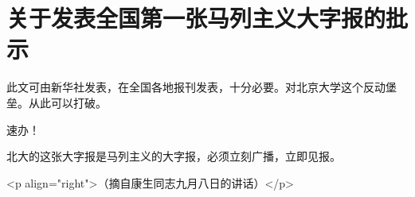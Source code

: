 \section[关于发表全国第一张马列主义大字报的批示（一九六六年六月一日）]{关于发表全国第一张马列主义大字报的批示}


此文可由新华社发表，在全国各地报刊发表，十分必要。对北京大学这个反动堡垒。从此可以打破。

速办！

北大的这张大字报是马列主义的大字报，必须立刻广播，立即见报。

<p align="right">（摘自康生同志九月八日的讲话）</p>


